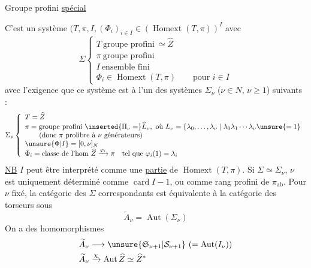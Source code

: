 Groupe profini \uline{spécial}

 C'est un système \inserted{$\Sigma=$}
$(T,\pi,I,(\Phi_i)_{i\in I}\in(\operatorname{Homext}(T,\pi))^I$
avec
\[\Sigma\left\{\begin{array}{l}
T\ \text{groupe profini}\ \simeq\widehat Z\\
\pi\ \text{groupe profini}\\
I\ \text{ensemble fini}\\
\Phi_i\in\operatorname{Homext}(T,\pi)\qquad\text{pour }i\in I
\end{array}\right.\]
avec l'exigence que ce système est
à l'un des systèmes $\Sigma_\nu$ ($\nu\in N$, $\nu\ge1$)
suivants :
\[\Sigma_\nu\left\{\begin{array}{l}
T=\widehat Z\\
\pi=\text{groupe profini}\ \inserted{\Pi_\nu=}\widehat L_\nu,\ \text{où }L_\nu=\left\{\lambda_0,\ldots,\lambda_\nu\mid\lambda_0\lambda_1\cdots\lambda_\nu\unsure{=1}\right.\\
\qquad(\text{donc }\pi\text{ prolibre à }\nu\text{ générateurs})\\
\unsure{\Phi|I}=[0,\nu]_N\\
\Phi_i=\text{classe de l'hom }\widehat Z\xrightarrow{\varphi_i}\pi\quad\text{tel que }\varphi_i(1)=\lambda_i
\end{array}\right.\]
\uline{NB} $I$ peut être interprété comme une \uline{partie} de $\operatorname{Homext}(T,\pi)$.
Si $\Sigma\simeq\Sigma_\nu$, $\nu$ est uniquement déterminé
comme $\operatorname{card}I-1$, ou 
 comme rang profini de $\pi_{\mathrm{ab}}$.
Pour $\nu$ fixé, la catégorie des $\Sigma$ correspondants
est équivalente à la catégorie des torseurs
sous
\[\widetilde A_\nu=\operatorname{Aut}(\Sigma_\nu)\]
On a des homomorphismes
\[\begin{aligned}
\widetilde A_\nu&\longrightarrow\unsure{\mathfrak S_{\nu+1}|\mathcal S_{\nu+1}}\ (=\operatorname{Aut}(I_\nu))\\
\widetilde A_\nu&\xrightarrow{\chi}\operatorname{Aut}\widehat Z\simeq\widehat Z^*
\end{aligned}\]
